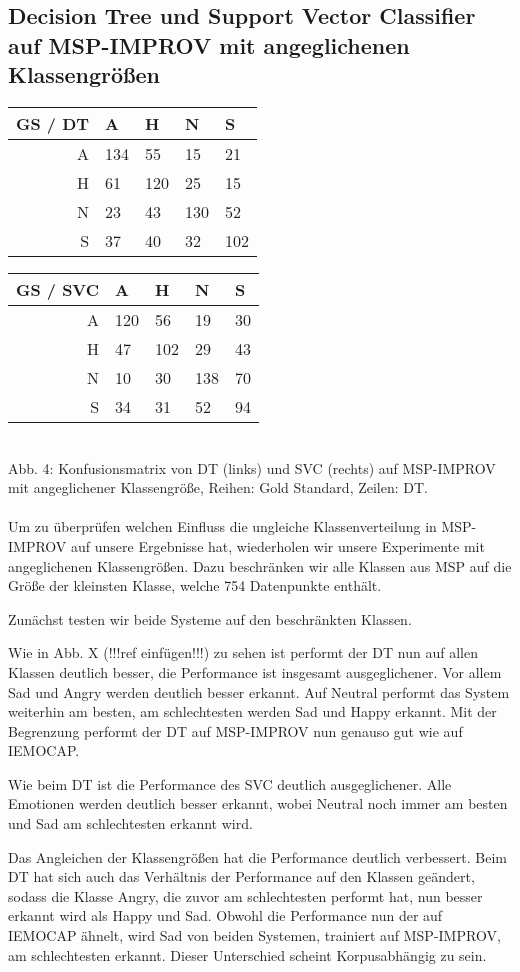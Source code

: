 \documentclass{article} %
\begin{document}
\subsection{Decision Tree und Support Vector Classifier auf MSP-IMPROV mit angeglichenen Klassengrößen}
\begin{tabular}{|r|llll|}
\hline
GS / DT & A & H & N & S \\
\hline
A & 134 & 55 & 15 & 21 \\
H & 61 & 120 & 25 & 15 \\
N & 23 & 43 & 130 & 52 \\
S & 37 & 40 & 32 & 102 \\
\hline
\end{tabular}
\begin{tabular}{|r|llll|}
\hline
GS / SVC & A & H & N & S \\
\hline
A & 120 & 56 & 19 & 30 \\
H & 47 & 102 & 29 & 43 \\
N & 10 & 30 & 138 & 70 \\
S & 34 & 31 & 52 & 94 \\
\hline
\end{tabular} \\
Abb. 4: Konfusionsmatrix von DT (links) und SVC (rechts) auf MSP-IMPROV mit angeglichener Klassengröße, Reihen: Gold Standard, Zeilen: DT. \\ \\
Um zu überprüfen welchen Einfluss die ungleiche Klassenverteilung in MSP-IMPROV auf unsere Ergebnisse hat, wiederholen wir unsere Experimente mit angeglichenen Klassengrößen. Dazu beschränken wir alle Klassen aus MSP auf die Größe der kleinsten Klasse, welche 754 Datenpunkte enthält. 

Zunächst testen wir beide Systeme auf den beschränkten Klassen. 

Wie in Abb. X (!!!ref einfügen!!!) zu sehen ist performt der DT nun auf allen Klassen deutlich besser, die Performance ist insgesamt ausgeglichener. Vor allem Sad und Angry werden deutlich besser erkannt.
Auf Neutral performt das System weiterhin am besten, am schlechtesten werden Sad und Happy erkannt. Mit der Begrenzung performt der DT auf MSP-IMPROV nun genauso gut wie auf IEMOCAP. 

Wie beim DT ist die Performance des SVC deutlich ausgeglichener. Alle Emotionen werden deutlich besser erkannt, wobei Neutral noch immer am besten und Sad am schlechtesten erkannt wird. 

Das Angleichen der Klassengrößen hat die Performance deutlich verbessert.
Beim DT hat sich auch das Verhältnis der Performance auf den Klassen geändert, sodass die Klasse Angry, die zuvor am schlechtesten performt hat, nun besser erkannt wird als Happy und Sad. Obwohl die Performance nun der auf IEMOCAP ähnelt, wird Sad von beiden Systemen, trainiert auf MSP-IMPROV, am schlechtesten erkannt. Dieser Unterschied scheint Korpusabhängig zu sein. 
\end{document}
